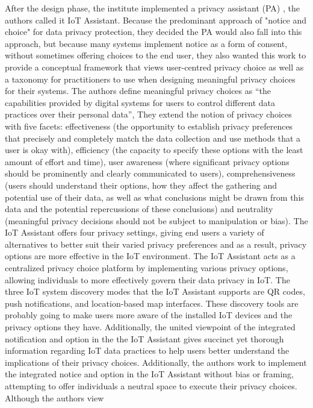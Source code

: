 After the design phase, the institute implemented a privacy assistant (PA) \cite{FengDesign},
the authors called it IoT Assistant. Because the predominant approach of
"notice and choice" for data privacy protection, they decided the PA would
also fall into this approach, but because many systems implement notice
as a form of consent, without sometimes offering choices to the end user,
they also wanted this work to provide a conceptual framework that views
user-centred privacy choice as well as a taxonomy for practitioners to
use when designing meaningful privacy choices for their systems. The authors
define meaningful privacy choices as ``the capabilities provided by digital
systems for users to control different data practices over their personal
data'', They extend the notion of privacy choices with five facets: effectiveness
(the opportunity to establish privacy preferences that precisely and completely
match the data collection and use methods that a user is okay with), efficiency
(the capacity to specify these options with the least amount of effort and
time), user awareness (where significant privacy options should be prominently
and clearly communicated to users), comprehensiveness (users should understand
their options, how they affect the gathering and potential use of their
data, as well as what conclusions might be drawn from this data and the
potential repercussions of these conclusions) and neutrality (meaningful
privacy decisions should not be subject to manipulation or bias). The IoT
Assistant offers four privacy settings, giving end users a variety of alternatives
to better suit their varied privacy preferences and as a result, privacy
options are more effective in the IoT environment. The IoT Assistant acts
as a centralized privacy choice platform by implementing various privacy
options, allowing individuals to more effectively govern their data privacy
in IoT. The three IoT system discovery modes that the IoT Assistant supports
are QR codes, push notifications, and location-based map interfaces. These
discovery tools are probably going to make users more aware of the installed
IoT devices and the privacy options they have. Additionally, the united
viewpoint of the integrated notification and option in the the IoT Assistant
gives succinct yet thorough information regarding IoT data practices to
help users better understand the implications of their privacy choices.
Additionally, the authors work to implement the integrated notice and option
in the IoT Assistant without bias or framing, attempting to offer individuals
a neutral space to execute their privacy choices. Although the authors view
